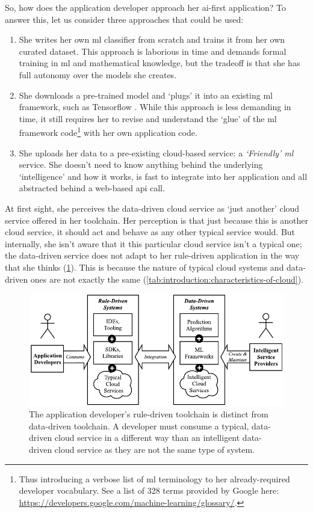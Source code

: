 So, how does the application developer approach her \gls{ai}-first application? To answer this, let us consider three approaches that could be used:

\begin{enumerate}
  \item She writes her own \gls{ml} classifier from scratch and trains it from her own curated dataset. This approach is laborious in time and demands formal training in \gls{ml} and mathematical knowledge, but the tradeoff is that she has full autonomy over the models she creates.
  \item She downloads a pre-trained model and `plugs' it into an existing \gls{ml} framework, such as Tensorflow \citep{Abadi:2016vn}. While this approach is less demanding in time, it still requires her to revise and understand the `glue' of the \gls{ml} framework code\footnote{Thus introducing a verbose list of \gls{ml} terminology to her already-required developer vocabulary. See a list of 328 terms provided by Google here: \url{https://developers.google.com/machine-learning/glossary/}.} with her own application code.
  \item She uploads her data to a pre-existing cloud-based service: a \textit{`Friendly' \acrlong{ml}} service. She doesn't need to know anything behind the underlying `intelligence' and how it works, is fast to integrate into her application and all abstracted behind a web-based \gls{api} call.
\end{enumerate}

\noindent
At first sight, she perceives the data-driven cloud service as `just another' cloud service  offered in her toolchain. Her perception is that just because this is another cloud service, it should act and behave as any other typical service would. But internally, she isn't aware that it this particular cloud service isn't a typical one; the data-driven service does not adapt to her rule-driven application in the way that she thinks (\cref{fig:introduction:rule-vs-data}). This is because the nature of typical cloud systems and data-driven ones are not exactly the same (\cref{tab:introduction:characteristics-of-cloud}).

\begin{figure}[h!]
\centering
\caption[Differences between data- and rule-driven cloud services]{The application developer's rule-driven toolchain is distinct from data-driven toolchain. A developer must consume a typical, data-driven cloud service in a different way than an intelligent data-driven cloud service as they are not the same type of system.}
\label{fig:introduction:rule-vs-data}
\includegraphics{rule-vs-data}
\end{figure}

